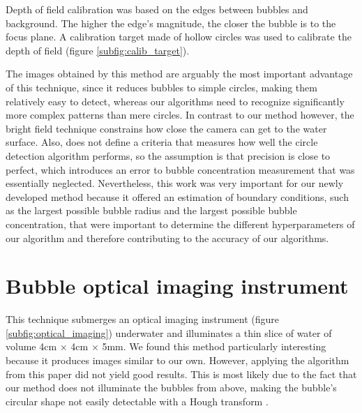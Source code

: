 	Depth of field calibration was based on the edges between bubbles and background. The higher the edge's magnitude, the closer the bubble is to the focus plane. A calibration target made of hollow circles was used to calibrate the depth of field (figure \ref{subfig:calib_target}). 
	
	The images obtained by this method are arguably the most important advantage of this technique, since it reduces bubbles to simple circles, making them relatively easy to detect, whereas our algorithms need to recognize significantly more complex patterns than mere circles.
	 In contrast to our method however, the bright field technique constrains how close the camera can get to the water surface. Also, \citet{Leonie} does not define a criteria that measures how well the circle detection algorithm performs, so the assumption is that precision is close to perfect, which introduces an error to bubble concentration measurement that was essentially neglected. 
	 Nevertheless, this work was very important for our newly developed method because it offered an estimation of boundary conditions, such as the largest possible bubble radius and the largest possible bubble concentration, that were important to determine the different hyperparameters of our algorithm and therefore contributing to the accuracy of our algorithms. 
	
	
\section{Bubble optical imaging instrument}
	This technique submerges an optical imaging instrument (figure \ref{subfig:optical_imaging}) underwater and illuminates a thin slice	of water of volume 4cm $\times$ 4cm $\times$ 5mm. We found this method  particularly interesting because it produces images similar to our own. However, applying the algorithm from this paper did not yield good results. This is most likely due to the fact that our method does not illuminate the bubbles from above, making the bubble's circular shape not easily detectable with a Hough transform \citep{Hough1972} \citep{Al-Lashi2016}.
	
